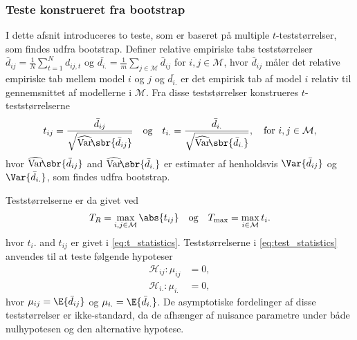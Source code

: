 \subsubsection{Teste konstrueret fra bootstrap}
I dette afsnit introduceres to teste, som er baseret på multiple \(t\)-teststørrelser, som findes udfra bootstrap.
Definer relative empiriske tabs teststørrelser \(\bar{d}_{ij} = \frac{1}{N} \sum_{t = 1}^N d_{ij,t}\) og \(\bar{d_{i.}} = \frac{1}{m} \sum_{j \in \mathcal{M}} \bar{d}_{ij}\) for \(i,j \in \mathcal{M}\), hvor \(\bar{d}_{ij}\) måler det relative empiriske tab mellem model \(i\) og \(j\) og \(\bar{d_{i.}}\) er det empirisk tab af model \(i\) relativ til gennemsnittet af modellerne i \(\mathcal{M}\). 
Fra disse teststørrelser konstrueres \(t\)-teststørrelserne
\begin{align}
t_{ij} = \frac{\bar{d}_{ij}}{\sqrt{\widehat{\mathrm{Var}}\!\sbr{\bar{d}_{ij}}}} \quad \text{og} \quad t_{i.} = \frac{\bar{d}_{i.}}{\sqrt{\widehat{\mathrm{Var}}\!\sbr{\bar{d}_{i.}}}}, \quad \text{for } i,j \in \mathcal{M}, \label{eq:t_statistics}
\end{align}
hvor \(\widehat{\mathrm{Var}}\!\sbr{\bar{d}_{ij}}\) and \(\widehat{\mathrm{Var}}\!\sbr{\bar{d}_{i.}}\) er estimater af henholdsvis \(\Var{\bar{d}_{ij}}\) og \(\Var{\bar{d}_{i.}}\), som findes udfra bootstrap.

Teststørrelserne er da givet ved
\begin{align} 
T_R = \max_{i,j \in \mathcal{M}} \abs{t_{ij}} \quad \text{og} \quad T_{\text{max}} = \max_{i \in \mathcal{M}} t_i. \label{eq:test_statistics}
\end{align}
hvor \(t_i.\) and \(t_{ij}\) er givet i \eqref{eq:t_statistics}.
Teststørrelserne i \eqref{eq:test_statistics} anvendes til at teste følgende hypoteser
\begin{align*}
\mathcal{H}_{ij}:\mu_{ij}&=0, \\
\mathcal{H}_{i.} : \mu_{i.}&=0,
\end{align*}
hvor \(\mu_{ij} = \E{\bar{d}_{ij}}\) og \(\mu_{i.} = \E{\bar{d}_{i.}}\).
De asymptotiske fordelinger af disse teststørrelser er ikke-standard, da de afhænger af nuisance parametre under både nulhypotesen og den alternative hypotese.
